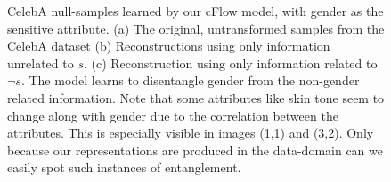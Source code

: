 \begin{figure}[tb]
{      %
      \label{fig:cflow_celeba_recon_s}
  }
  \caption{
      CelebA null-samples learned by our \ac{cFlow} model, with gender as the sensitive attribute.
      (a) The original, untransformed samples from the CelebA dataset
      (b) Reconstructions using only information unrelated to $s$.
      (c) Reconstruction using only information related to $\neg s$.
      The model learns to disentangle gender from the non-gender related information.
      Note that some attributes like skin tone seem to change along with gender due to the
      correlation between the attributes.
      This is especially visible in images (1,1) and (3,2). Only because our representations are
      produced in the data-domain can we easily spot such instances of entanglement.
  }%
  \label{fig:celeba_cflow}
\end{figure}

